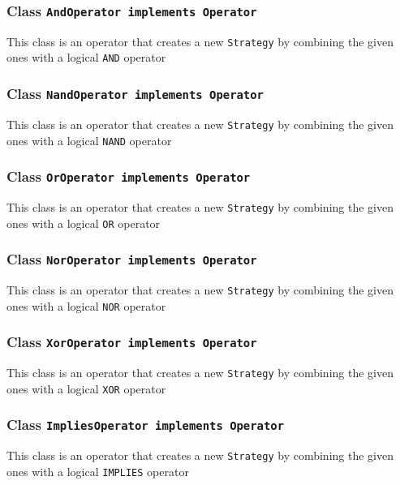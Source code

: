 \documentclass[parskip=full,11pt]{scrartcl}
\begin{document}
\subsubsection{Class \texttt{AndOperator implements Operator}}

This class is an operator that creates a new \texttt{Strategy} by combining the given ones with a logical \texttt{AND} operator 

\subsubsection{Class \texttt{NandOperator implements Operator}}

This class is an operator that creates a new \texttt{Strategy} by combining the given ones with a logical \texttt{NAND} operator 

\subsubsection{Class \texttt{OrOperator implements Operator}}

This class is an operator that creates a new \texttt{Strategy} by combining the given ones with a logical \texttt{OR} operator

\subsubsection{Class \texttt{NorOperator implements Operator}}

This class is an operator that creates a new \texttt{Strategy} by combining the given ones with a logical \texttt{NOR} operator 

\subsubsection{Class \texttt{XorOperator implements Operator}}

This class is an operator that creates a new \texttt{Strategy} by combining the given ones with a logical \texttt{XOR} operator 

\subsubsection{Class \texttt{ImpliesOperator implements Operator}}

This class is an operator that creates a new \texttt{Strategy} by combining the given ones with a logical \texttt{IMPLIES} operator  
\end{document}
